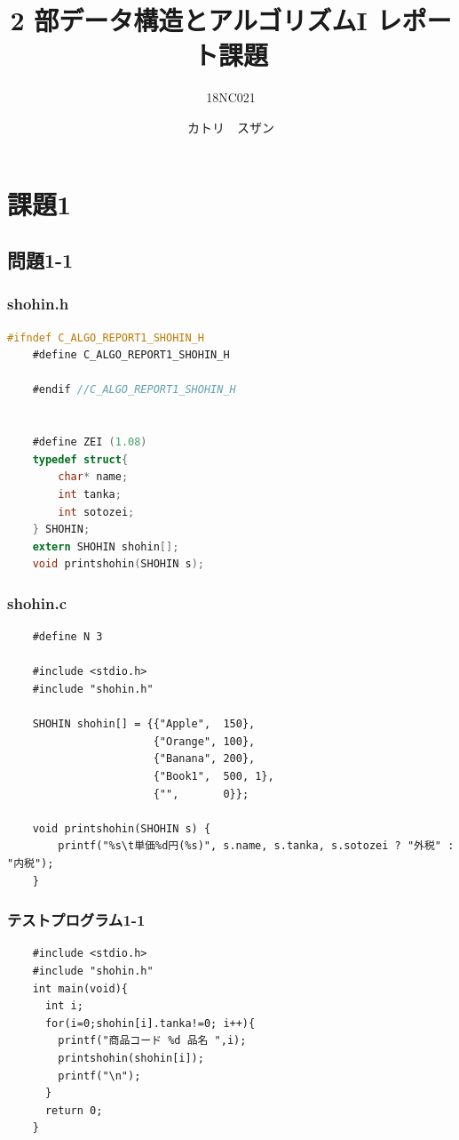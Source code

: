 \documentclass[10pt]{article}
\title{2 部データ構造とアルゴリズムI レポート課題}
\author{18NC021}
\date{カトリ　スザン}
\begin{document}
\begin{titlepage}
	\maketitle
\end{titlepage}


 
\tableofcontents
\pagebreak


\section{課題1}

\subsection{問題1-1}
\subsubsection{shohin.h}

\begin{lstlisting}[language=C]
    #ifndef C_ALGO_REPORT1_SHOHIN_H
    #define C_ALGO_REPORT1_SHOHIN_H
    
    #endif //C_ALGO_REPORT1_SHOHIN_H
    
    
    #define ZEI (1.08)
    typedef struct{
        char* name;
        int tanka;
        int sotozei;
    } SHOHIN;
    extern SHOHIN shohin[];
    void printshohin(SHOHIN s);
\end{lstlisting}

\subsubsection{shohin.c}

\begin{lstlisting}
    #define N 3
    
    #include <stdio.h>
    #include "shohin.h"
    
    SHOHIN shohin[] = {{"Apple",  150},
                       {"Orange", 100},
                       {"Banana", 200},
                       {"Book1",  500, 1},
                       {"",       0}};
    
    void printshohin(SHOHIN s) {
        printf("%s\t単価%d円(%s)", s.name, s.tanka, s.sotozei ? "外税" : "内税");
    }
\end{lstlisting}

\subsubsection{テストプログラム1-1}
\begin{lstlisting}
    #include <stdio.h>
    #include "shohin.h"
    int main(void){
      int i;
      for(i=0;shohin[i].tanka!=0; i++){
        printf("商品コード %d 品名 ",i);
        printshohin(shohin[i]);
        printf("\n");
      }
      return 0;
    }
\end{lstlisting}
\end{document}
